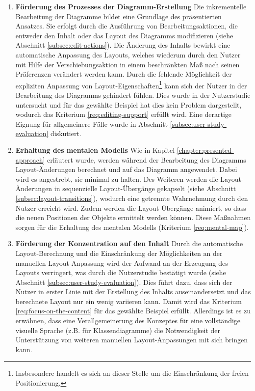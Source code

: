 \begin{enumerate}[label={K.\arabic*}]
\item
\label{eval:editing-support}
\textbf{Förderung des Prozesses der Diagramm-Erstellung}
Die inkrementelle Bearbeitung der Diagramme bildet eine Grundlage des präsentierten Ansatzes. Sie erfolgt durch die Ausführung von Bearbeitungsaktionen, die entweder den Inhalt oder das Layout des Diagramms modifizieren (siehe Abschnitt \ref{subsec:edit-actions}). Die Änderung des Inhalts bewirkt eine automatische Anpassung des Layouts, welches wiederum durch den Nutzer mit Hilfe der Verschiebungsaktion in einem beschränkten Maß nach seinen Präferenzen verändert werden kann. Durch die fehlende Möglichkeit der expliziten Anpassung von Layout-Eigenschaften\footnote{Insbesondere handelt es sich an dieser Stelle um die Einschränkung der freien Positionierung.} kann sich der Nutzer in der Bearbeitung des Diagramms gehindert fühlen. Dies wurde in der Nutzerstudie untersucht und für das gewählte Beispiel hat dies kein Problem dargestellt, wodurch das Kriterium \ref{req:editing-support} erfüllt wird. Eine derartige Eignung für allgemeinere Fälle wurde in Abschnitt \ref{subsec:user-study-evaluation} diskutiert.

\item
\label{eval:mental-map}
\textbf{Erhaltung des mentalen Modells}
Wie in Kapitel \ref{chapter:presented-approach} erläutert wurde, werden während der Bearbeitung des Diagramms Layout-Änderungen berechnet und auf das Diagramm angewendet. Dabei wird es angestrebt, sie minimal zu halten. Des Weiteren werden die Layout-Änderungen in sequenzielle Layout-Übergänge gekapselt (siehe Abschnitt \ref{subsec:layout-transitions}), wodurch eine getrennte Wahrnehmung durch den Nutzer erreicht wird. Zudem werden die Layout-Übergänge animiert, so dass die neuen Positionen der Objekte ermittelt werden können. Diese Maßnahmen sorgen für die Erhaltung des mentalen Modells (Kriterium \ref{req:mental-map}).

\item
\label{eval:focus-on-the-content}
\textbf{Förderung der Konzentration auf den Inhalt}
Durch die automatische Layout-Be\-rech\-nung und die Einschränkung der Möglichkeiten an der manuellen Layout-Anpassung wird der Aufwand an der Erzeugung des Layouts verringert, was durch die Nutzerstudie bestätigt wurde (siehe Abschnitt \ref{subsec:user-study-evaluation}). Dies führt dazu, dass sich der Nutzer in erster Linie mit der Erstellung des Inhalts auseinandersetzt und das berechnete Layout nur ein wenig variieren kann. Damit wird das Kriterium \ref{req:focus-on-the-content} für das gewählte Beispiel erfüllt. Allerdings ist es zu erwähnen, dass eine Verallgemeinerung des Konzeptes für eine vollständige visuelle Sprache (z.B. für Klassendiagramme) die Notwendigkeit der Unterstützung von weiteren manuellen Layout-Anpassungen mit sich bringen kann.


\end{enumerate}
